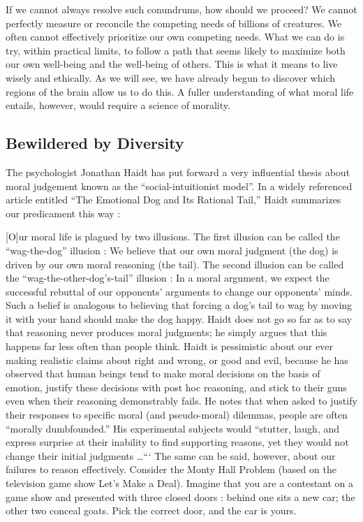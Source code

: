\documentclass[a4paper,14pt]{extbook}
\begin{document}
If we cannot always resolve such conundrums, how should we proceed?
We cannot perfectly measure or reconcile the competing needs of billions of creatures.
We often cannot effectively prioritize our own competing needs.
What we can do is try, within practical limits, to follow a path that seems likely to maximize both our own well-being and the well-being of others.
This is what it means to live wisely and ethically.
As we will see, we have already begun to discover which regions of the brain allow us to do this.
A fuller understanding of what moral life entails, however, would require a science of morality.

\subsection{Bewildered by Diversity}

The psychologist Jonathan Haidt has put forward a very influential thesis about moral judgement known as the ``social-intuitionist model''.
In a widely referenced article entitled ``The Emotional Dog and Its Rational Tail,'' Haidt summarizes our predicament this way :

[O]ur moral life is plagued by two illusions.
The first illusion can be called the ``wag-the-dog'' illusion :
We believe that our own moral judgment (the dog) is driven by our own moral reasoning (the tail).
The second illusion can be called the “wag-the-other-dog's-tail” illusion :
In a moral argument, we expect the successful rebuttal of our opponents' arguments to change our opponents' minds.
Such a belief is analogous to believing that forcing a dog's tail to wag by moving it with your hand should make the dog happy.
Haidt does not go so far as to say that reasoning never produces moral judgments;
he simply argues that this happens far less often than people think.
Haidt is pessimistic about our ever making realistic claims about right and wrong, or good and evil, because he has observed that human beings tend to make moral decisions on the basis of emotion, justify these decisions with post hoc reasoning, and stick to their guns even when their reasoning demonstrably fails.
He notes that when asked to justify their responses to specific moral (and pseudo-moral) dilemmas, people are often ``morally dumbfounded.''
His experimental subjects would ``stutter, laugh, and express surprise at their inability to find supporting reasons, yet they would not change their initial judgments \dots```
The same can be said, however, about our failures to reason effectively.
Consider the Monty Hall Problem (based on the television game show Let's Make a Deal).
Imagine that you are a contestant on a game show and presented with three closed doors :
behind one sits a new car;
the other two conceal goats.
Pick the correct door, and the car is yours.
\end{document}

